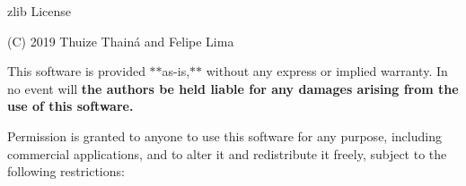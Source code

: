 zlib License

(C) 2019 Thuize Thainá and Felipe Lima

This software is provided $\ast$$\ast$\textquotesingle{}as-\/is\textquotesingle{},$\ast$$\ast$ without any express or implied warranty. In no event will {\bfseries{the authors be held liable for any damages arising from the use of this software.}}

Permission is granted to anyone to use this software for any purpose, including commercial applications, and to alter it and redistribute it freely, subject to the following restrictions\+: 
\begin{DoxyCode}{0}
\end{DoxyCode}
 
